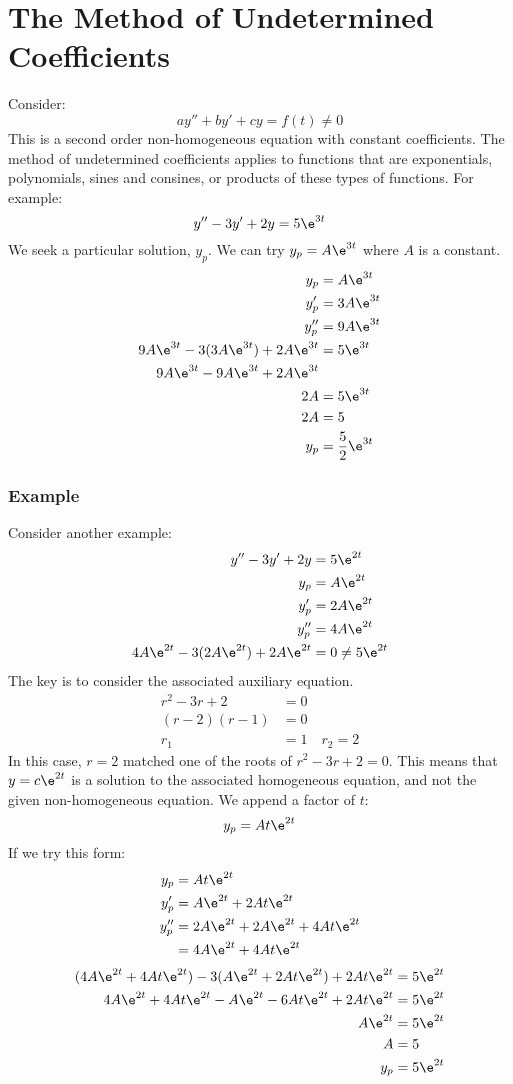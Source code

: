 \documentclass{math}
\begin{document}
\section*{The Method of Undetermined Coefficients}
Consider:
\[ ay''+by'+cy = f(t) \ne 0 \]
This is a second order non-homogeneous equation with constant coefficients. The
method of undetermined coefficients applies to functions that are exponentials,
polynomials, sines and consines, or products of these types of functions. For
example:
\[ y''-3y'+2y = 5\e^{3t} \]
We seek a particular solution, \( y_p \). We can try \( y_p = A\e^{3t} \) where
\( A \) is a constant.
\begin{align*}
  y_p &= A\e^{3t} \\
  y_p' &= 3A\e^{3t} \\
  y_p'' &= 9A\e^{3t} \\
  9A\e^{3t}-3(3A\e^{3t})+2A\e^{3t} &= 5\e^{3t} \\
  9A\e^{3t}-9A\e^{3t}+2A\e^{3t} \\
  2A &= 5\e^{3t} \\
  2A &= 5 \\
  y_p &= \frac{5}{2}\e^{3t}
\end{align*}

\subsubsection*{Example}
Consider another example:
\begin{align*}
  y''-3y'+2y &= 5\e^{2t} \\
  y_p &= A\e^{2t} \\
  y_p' &= 2A\e^{2t} \\
  y_p'' &= 4A\e^{2t} \\
  4A\e^{2t}-3(2A\e^{2t})+2A\e^{2t} &= 0 \ne 5\e^{2t}
\end{align*}
The key is to consider the associated auxiliary equation.
\begin{align*}
  r^2-3r+2 &= 0 \\
  (r-2)(r-1) &= 0 \\
  r_1 &= 1 \quad r_2 = 2
\end{align*}
In this case, \( r = 2 \) matched one of the roots of \( r^2-3r+2 = 0 \). This
means that \( y = c\e^{2t} \) is a solution to the associated homogeneous
equation, and not the given non-homogeneous equation. We append a factor of
\( t \):
\[ y_p = At\e^{2t} \]
If we try this form:
\begin{align*}
  y_p &= At\e^{2t} \\
  y_p' &= A\e^{2t}+2At\e^{2t} \\
  y_p'' &= 2A\e^{2t}+2A\e^{2t}+4At\e^{2t} \\
  &= 4A\e^{2t}+4At\e^{2t}
\end{align*}
\begin{align*}
  (4A\e^{2t}+4At\e^{2t})-3(A\e^{2t}+2At\e^{2t})+2At\e^{2t} &= 5\e^{2t} \\
  4A\e^{2t}+4At\e^{2t}-A\e^{2t}-6At\e^{2t}+2At\e^{2t} &= 5\e^{2t} \\
  A\e^{2t} &= 5\e^{2t} \\
  A &= 5 \\
  y_p &= 5\e^{2t}
\end{align*}
\end{document}
